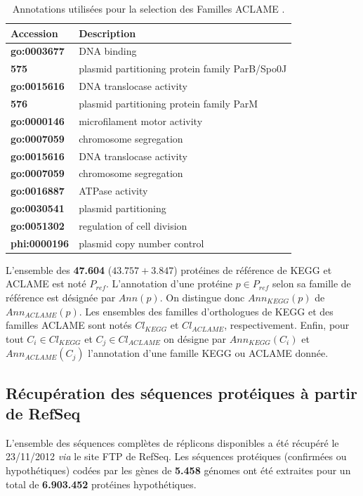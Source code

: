 \begin{table}[H]
\caption[Annotations utilisées pour la selection des Familles ACLAME]{Annotations utilisées pour la selection des Familles ACLAME \citep{leplae2010aclame}.}\label{aclame}
\begin{center}
\begin{tabular}{>{\bfseries\small}l >{\small}l}
{\normalsize Accession}&\textbf{\normalsize Description}\\
\hline
go:0003677 & DNA binding\\
575 & plasmid partitioning protein family ParB/Spo0J\\
go:0015616 & DNA translocase activity\\
576 & plasmid partitioning protein family ParM\\
go:0000146 & microfilament motor activity\\
go:0007059 & chromosome segregation\\
go:0015616 & DNA translocase activity\\
go:0007059 & chromosome segregation\\
go:0016887 & ATPase activity\\
go:0030541 & plasmid partitioning\\
go:0051302 & regulation of cell division\\
phi:0000196 & plasmid copy number control\\
\end{tabular}
\end{center}
\end{table} 
   
      L'ensemble des \textbf{47.604} ($43.757+3.847$) protéines de référence de  KEGG  et ACLAME est noté \textbf{$P_{ref}$}.  L'annotation d'une protéine $p \in P_{ref}$ selon sa famille de référence est désignée par $Ann(p)$. On distingue donc $Ann_{KEGG}(p)$ de $Ann_{ACLAME}(p)$. Les ensembles des familles d'orthologues de KEGG et des familles ACLAME sont notés $Cl_{KEGG}$ et $Cl_{ACLAME}$, respectivement. Enfin, pour tout $C_{i} \in Cl_{KEGG}$ et $C_{j} \in Cl_{ACLAME}$ on désigne par $Ann_{KEGG}(C_{i})$ et $Ann_{ACLAME}(C_{j})$ l'annotation d'une famille KEGG ou ACLAME donnée.
 

\subsection{Récupération des séquences protéiques à partir de RefSeq}
  L'ensemble des séquences complètes de réplicons disponibles a été récupéré le 23/11/2012 \textit{via} le site FTP de RefSeq. Les séquences protéiques (confirmées ou hypothétiques) codées par les gènes de \textbf{5.458} génomes ont été extraites pour un total de \textbf{6.903.452} protéines hypothétiques.
  

